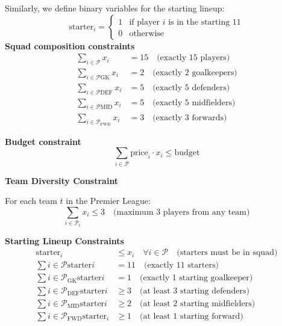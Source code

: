 Similarly, we define binary variables for the starting lineup:
\begin{equation}
    \text{starter}_i =
    \begin{cases}
        1 & \text{if player $i$ is in the starting 11} \\
        0 & \text{otherwise}
    \end{cases}
\end{equation}
\break
\textbf{Squad composition constraints}
\begin{align}
    \sum_{i \in \mathcal{P}} x_i &= 15 \quad \text{(exactly 15 players)} \\
    \sum_{i \in \mathcal{P}{\text{GK}}} x_i &= 2 \quad \text{(exactly 2 goalkeepers)} \\
    \sum_{i \in \mathcal{P}{\text{DEF}}} x_i &= 5 \quad \text{(exactly 5 defenders)} \\
    \sum_{i \in \mathcal{P}{\text{MID}}} x_i &= 5 \quad \text{(exactly 5 midfielders)} \\
    \sum_{i \in \mathcal{P}_{\text{FWD}}} x_i &= 3 \quad \text{(exactly 3 forwards)}
\end{align}

\textbf{Budget constraint}
\begin{equation}
    \sum_{i \in \mathcal{P}} \text{price}_i \cdot x_i \leq \text{budget}
\end{equation}

\textbf{Team Diversity Constraint}

For each team $t$ in the Premier League:
\begin{equation}
\sum_{i \in \mathcal{P}_t} x_i \leq 3 \quad \text{(maximum 3 players from any team)}
\end{equation}

\textbf{Starting Lineup Constraints}
\begin{align}
    \text{starter}_i &\leq x_i \quad \forall i \in \mathcal{P} \quad \text{(starters must be in squad)} \\
    \sum{i \in \mathcal{P}} \text{starter}i &= 11 \quad \text{(exactly 11 starters)} \\
    \sum{i \in \mathcal{P}_{\text{GK}}} \text{starter}i &= 1 \quad \text{(exactly 1 starting goalkeeper)} \\
    \sum{i \in \mathcal{P}_{\text{DEF}}} \text{starter}i &\geq 3 \quad \text{(at least 3 starting defenders)} \\
    \sum{i \in \mathcal{P}_{\text{MID}}} \text{starter}i &\geq 2 \quad \text{(at least 2 starting midfielders)} \\
    \sum{i \in \mathcal{P}_{\text{FWD}}} \text{starter}_i &\geq 1 \quad \text{(at least 1 starting forward)}
\end{align}

